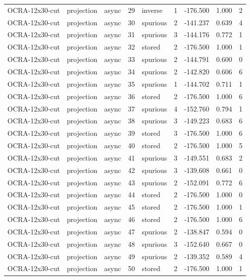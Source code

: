 \begin{tabular}{lllrlrrrr}
OCRA-12x30-cut & projection & async & 29 & inverse & 1 & -176.500 & 1.000 & 2 \\
OCRA-12x30-cut & projection & async & 30 & spurious & 2 & -141.237 & 0.639 & 4 \\
OCRA-12x30-cut & projection & async & 31 & spurious & 3 & -144.176 & 0.772 & 1 \\
OCRA-12x30-cut & projection & async & 32 & stored & 2 & -176.500 & 1.000 & 1 \\
OCRA-12x30-cut & projection & async & 33 & spurious & 2 & -144.791 & 0.600 & 0 \\
OCRA-12x30-cut & projection & async & 34 & spurious & 2 & -142.820 & 0.606 & 6 \\
OCRA-12x30-cut & projection & async & 35 & spurious & 1 & -144.702 & 0.711 & 1 \\
OCRA-12x30-cut & projection & async & 36 & stored & 2 & -176.500 & 1.000 & 6 \\
OCRA-12x30-cut & projection & async & 37 & spurious & 4 & -152.760 & 0.794 & 1 \\
OCRA-12x30-cut & projection & async & 38 & spurious & 3 & -149.223 & 0.683 & 6 \\
OCRA-12x30-cut & projection & async & 39 & stored & 3 & -176.500 & 1.000 & 6 \\
OCRA-12x30-cut & projection & async & 40 & stored & 2 & -176.500 & 1.000 & 5 \\
OCRA-12x30-cut & projection & async & 41 & spurious & 3 & -149.551 & 0.683 & 2 \\
OCRA-12x30-cut & projection & async & 42 & spurious & 3 & -139.608 & 0.661 & 0 \\
OCRA-12x30-cut & projection & async & 43 & spurious & 2 & -152.091 & 0.772 & 6 \\
OCRA-12x30-cut & projection & async & 44 & stored & 2 & -176.500 & 1.000 & 0 \\
OCRA-12x30-cut & projection & async & 45 & stored & 2 & -176.500 & 1.000 & 1 \\
OCRA-12x30-cut & projection & async & 46 & stored & 2 & -176.500 & 1.000 & 6 \\
OCRA-12x30-cut & projection & async & 47 & spurious & 2 & -138.847 & 0.594 & 0 \\
OCRA-12x30-cut & projection & async & 48 & spurious & 3 & -152.640 & 0.667 & 0 \\
OCRA-12x30-cut & projection & async & 49 & spurious & 2 & -139.352 & 0.589 & 4 \\
OCRA-12x30-cut & projection & async & 50 & stored & 2 & -176.500 & 1.000 & 1 \\

\end{tabular}

